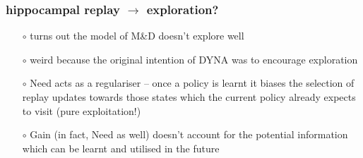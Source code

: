 \documentclass[aspectratio=169]{beamer}
\begin{document}
\begin{frame}
    \frametitle{hippocampal replay $\rightarrow$ exploration?}
    \begin{itemize}
        \item[$\circ$] turns out the model of M\&D doesn't explore well
        \item[$\circ$] weird because the original intention of DYNA was to encourage exploration 
        \item[$\circ$] Need acts as a regulariser -- once a policy is learnt it biases the selection of 
        replay updates towards those states which the current policy already expects to visit (pure exploitation!)
        \item[$\circ$] Gain (in fact, Need as well) doesn't account for the potential information which can be learnt and utilised in the future 
    \end{itemize}
\end{frame}
\end{document}
